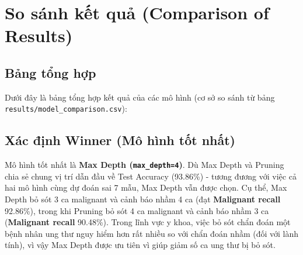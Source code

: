 \chapter{So sánh kết quả (Comparison of Results)}
\label{chap:comparison}

\section{Bảng tổng hợp}
Dưới đây là bảng tổng hợp kết quả của các mô hình (cơ sở so sánh từ bảng \texttt{results/model\_comparison.csv}):

\begin{table}[H]
\centering
\caption{So sánh Baseline và các phương pháp cải thiện}
\label{tab:model-comparison}
\end{table}

\section{Xác định Winner (Mô hình tốt nhất)}
Mô hình tốt nhất là \textbf{Max Depth (\texttt{max\_depth=4})}. Dù Max Depth và Pruning chia sẻ chung vị trí dẫn đầu về Test Accuracy (93.86\%) - tương đương với việc cả hai mô hình cùng dự đoán sai 7 mẫu, Max Depth vẫn được chọn. Cụ thể, Max Depth bỏ sót 3 ca malignant và cảnh báo nhầm 4 ca (đạt \textbf{Malignant recall} 92.86\%), trong khi Pruning bỏ sót 4 ca malignant và cảnh báo nhầm 3 ca (\textbf{Malignant recall} 90.48\%). Trong lĩnh vực y khoa, việc bỏ sót chẩn đoán một bệnh nhân ung thư nguy hiểm hơn rất nhiều so với chẩn đoán nhầm (đối với lành tính), vì vậy Max Depth được ưu tiên vì giúp giảm số ca ung thư bị bỏ sót.

